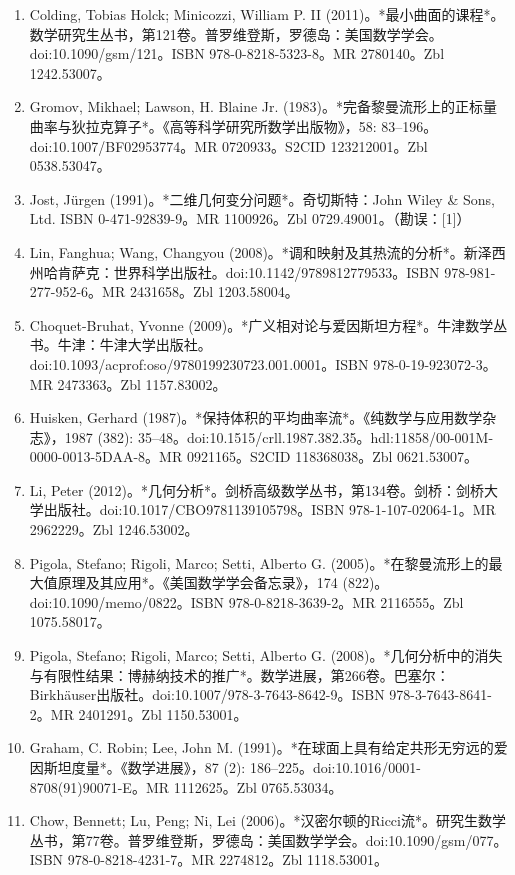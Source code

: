 \begin{enumerate}
\item Colding, Tobias Holck; Minicozzi, William P. II (2011)。*最小曲面的课程*。数学研究生丛书，第121卷。普罗维登斯，罗德岛：美国数学学会。doi:10.1090/gsm/121。ISBN 978-0-8218-5323-8。MR 2780140。Zbl 1242.53007。  
\item Gromov, Mikhael; Lawson, H. Blaine Jr. (1983)。*完备黎曼流形上的正标量曲率与狄拉克算子*。《高等科学研究所数学出版物》，58: 83–196。doi:10.1007/BF02953774。MR 0720933。S2CID 123212001。Zbl 0538.53047。  
\item Jost, Jürgen (1991)。*二维几何变分问题*。奇切斯特：John Wiley & Sons, Ltd. ISBN 0-471-92839-9。MR 1100926。Zbl 0729.49001。（勘误：[1]）  
\item Lin, Fanghua; Wang, Changyou (2008)。*调和映射及其热流的分析*。新泽西州哈肯萨克：世界科学出版社。doi:10.1142/9789812779533。ISBN 978-981-277-952-6。MR 2431658。Zbl 1203.58004。
\item Choquet-Bruhat, Yvonne (2009)。*广义相对论与爱因斯坦方程*。牛津数学丛书。牛津：牛津大学出版社。doi:10.1093/acprof:oso/9780199230723.001.0001。ISBN 978-0-19-923072-3。MR 2473363。Zbl 1157.83002。  
\item Huisken, Gerhard (1987)。*保持体积的平均曲率流*。《纯数学与应用数学杂志》，1987 (382): 35–48。doi:10.1515/crll.1987.382.35。hdl:11858/00-001M-0000-0013-5DAA-8。MR 0921165。S2CID 118368038。Zbl 0621.53007。  
\item Li, Peter (2012)。*几何分析*。剑桥高级数学丛书，第134卷。剑桥：剑桥大学出版社。doi:10.1017/CBO9781139105798。ISBN 978-1-107-02064-1。MR 2962229。Zbl 1246.53002。
\item Pigola, Stefano; Rigoli, Marco; Setti, Alberto G. (2005)。*在黎曼流形上的最大值原理及其应用*。《美国数学学会备忘录》，174 (822)。doi:10.1090/memo/0822。ISBN 978-0-8218-3639-2。MR 2116555。Zbl 1075.58017。  
\item Pigola, Stefano; Rigoli, Marco; Setti, Alberto G. (2008)。*几何分析中的消失与有限性结果：博赫纳技术的推广*。数学进展，第266卷。巴塞尔：Birkhäuser出版社。doi:10.1007/978-3-7643-8642-9。ISBN 978-3-7643-8641-2。MR 2401291。Zbl 1150.53001。  
\item Graham, C. Robin; Lee, John M. (1991)。*在球面上具有给定共形无穷远的爱因斯坦度量*。《数学进展》，87 (2): 186–225。doi:10.1016/0001-8708(91)90071-E。MR 1112625。Zbl 0765.53034。  
\item Chow, Bennett; Lu, Peng; Ni, Lei (2006)。*汉密尔顿的Ricci流*。研究生数学丛书，第77卷。普罗维登斯，罗德岛：美国数学学会。doi:10.1090/gsm/077。ISBN 978-0-8218-4231-7。MR 2274812。Zbl 1118.53001。

\end{enumerate}
